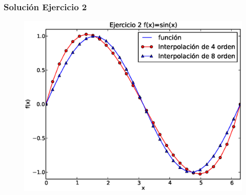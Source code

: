 \begin{frame}
\frametitle{Solución Ejercicio 2}
\begin{figure}
	\centering
	\includegraphics[scale=0.45]{Imagenes/ejercicioTema21_2.eps} 
\end{figure}
\end{frame}
